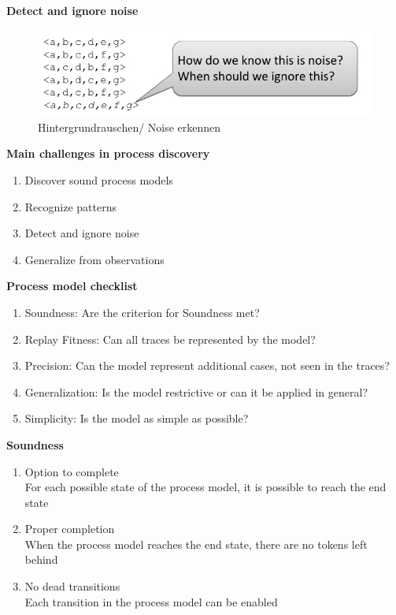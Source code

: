 \textbf{Detect and ignore noise}
\begin{figure}[H]
\includegraphics[width=14cm]{Chapters/Notizen_Graphics/Detect_Noise.jpg}
\caption{Hintergrundrauschen/ Noise erkennen} 
\end{figure}

\vspace{5mm}\pagebreak
\textbf{Main challenges in process discovery}
\begin{enumerate}
\setlength{\itemsep}{3pt}
\item{Discover sound process models}
\item{Recognize patterns}
\item{Detect and ignore noise}
\item{Generalize from observations}
\end{enumerate}

\vspace{5mm}
\textbf{Process model checklist}
\begin{enumerate}
\setlength{\itemsep}{3pt}
\item Soundness: Are the criterion for Soundness met?
\item Replay Fitness: Can all traces be represented by the model?
\item Precision: Can the model represent additional cases, not seen in the traces? 
\item Generalization: Is the model restrictive or can it be applied in general?
\item Simplicity: Is the model as simple as possible?
\end{enumerate}

\vspace{5mm}
\textbf{Soundness}
\begin{enumerate}
\setlength{\itemsep}{3pt}
\item{Option to complete}\\
For each possible state of the process model, it is possible to reach the end state

\item{Proper completion}\\
When the process model reaches the end state, there are no tokens left behind

\item{No dead transitions}\\
Each transition in the process model can be enabled
\end{enumerate}

